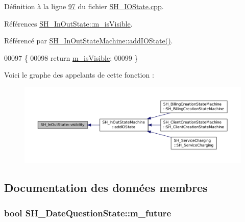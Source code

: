 Définition à la ligne \hyperlink{SH__IOState_8cpp_source_l00097}{97} du fichier \hyperlink{SH__IOState_8cpp_source}{S\-H\-\_\-\-I\-O\-State.\-cpp}.



Références \hyperlink{classSH__InOutState_a8fd66b185c9a55f0e84daa97e2acf53a}{S\-H\-\_\-\-In\-Out\-State\-::m\-\_\-is\-Visible}.



Référencé par \hyperlink{classSH__InOutStateMachine_a2528cffddbe6f98c32ebef41423c0118}{S\-H\-\_\-\-In\-Out\-State\-Machine\-::add\-I\-O\-State()}.


\begin{DoxyCode}
00097                                \{
00098     \textcolor{keywordflow}{return} \hyperlink{classSH__InOutState_a8fd66b185c9a55f0e84daa97e2acf53a}{m\_isVisible};
00099 \}
\end{DoxyCode}


Voici le graphe des appelants de cette fonction \-:\nopagebreak
\begin{figure}[H]
\begin{center}
\leavevmode
\includegraphics[width=350pt]{classSH__InOutState_a3a18752c4122c26a2ebf38310c9c1b75_icgraph}
\end{center}
\end{figure}




\subsection{Documentation des données membres}
\hypertarget{classSH__DateQuestionState_a0a1577dc70f9c1120a6d623f8eb635c8}{
\subsubsection[{m\-\_\-future}]{\setlength{\rightskip}{0pt plus 5cm}bool S\-H\-\_\-\-Date\-Question\-State\-::m\-\_\-future\hspace{0.3cm}{\ttfamily [private]}}}\label{classSH__DateQuestionState_a0a1577dc70f9c1120a6d623f8eb635c8}


